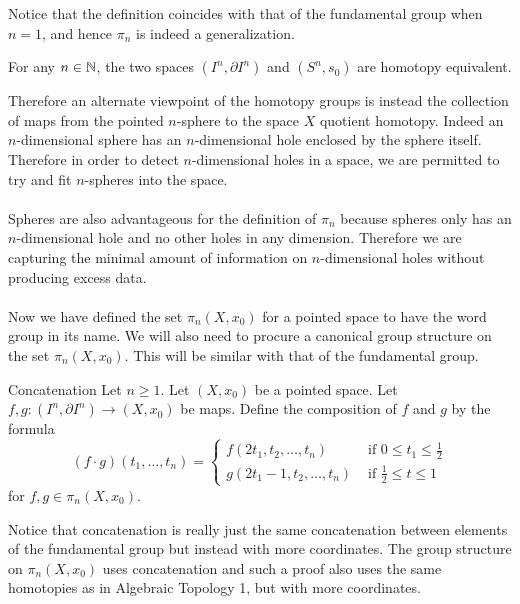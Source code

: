 \documentclass[a4paper]{article}
\begin{document}
Notice that the definition coincides with that of the fundamental group when $n=1$, and hence $\pi_n$ is indeed a generalization. 

\begin{lmm}{}{} For any $n\in\mathbb{N}$, the two spaces $(I^n,\partial I^n)$ and $(S^n,s_0)$ are homotopy equivalent. 
\end{lmm}

Therefore an alternate viewpoint of the homotopy groups is instead the collection of maps from the pointed $n$-sphere to the space $X$ quotient homotopy. Indeed an $n$-dimensional sphere has an $n$-dimensional hole enclosed by the sphere itself. Therefore in order to detect $n$-dimensional holes in a space, we are permitted to try and fit $n$-spheres into the space. \\~\\

Spheres are also advantageous for the definition of $\pi_n$ because spheres only has an $n$-dimensional hole and no other holes in any dimension. Therefore we are capturing the minimal amount of information on $n$-dimensional holes without producing excess data. \\~\\

Now we have defined the set $\pi_n(X,x_0)$ for a pointed space to have the word group in its name. We will also need to procure a canonical group structure on the set $\pi_n(X,x_0)$. This will be similar with that of the fundamental group. 

\begin{defn}{Concatenation}{} Let $n\geq 1$. Let $(X,x_0)$ be a pointed space. Let $f,g:(I^n,\partial I^n)\to(X,x_0)$ be maps. Define the composition of $f$ and $g$ by the formula $$(f\cdot g)(t_1,\dots,t_n)=\begin{cases}
f(2t_1,t_2,\dots,t_n) & \text{ if } 0\leq t_1\leq\frac{1}{2}\\
g(2t_1-1,t_2,\dots,t_n) & \text{ if } \frac{1}{2}\leq t\leq 1
\end{cases}$$ for $f,g\in\pi_n(X,x_0)$. 
\end{defn}

Notice that concatenation is really just the same concatenation between elements of the fundamental group but instead with more coordinates. The group structure on $\pi_n(X,x_0)$ uses concatenation and such a proof also uses the same homotopies as in Algebraic Topology 1, but with more coordinates. 
\end{document}
